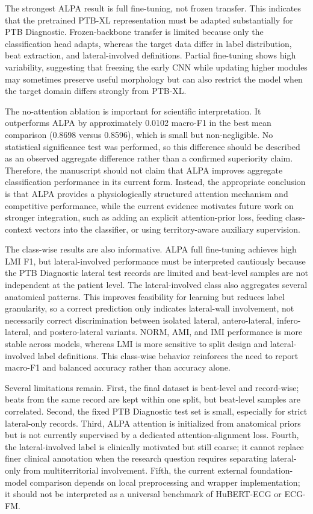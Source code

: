 \documentclass[a4paper,fleqn]{cas-dc}
\begin{document}
The strongest ALPA result is full fine-tuning, not frozen transfer. This indicates that the
pretrained PTB-XL representation must be adapted substantially for PTB Diagnostic. Frozen-backbone
transfer is limited because only the classification head adapts, whereas the target data differ in
label distribution, beat extraction, and lateral-involved definitions. Partial fine-tuning shows
high variability, suggesting that freezing the early CNN while updating higher modules may sometimes
preserve useful morphology but can also restrict the model when the target domain differs strongly
from PTB-XL.

The no-attention ablation is important for scientific interpretation. It outperforms ALPA by
approximately 0.0102 macro-F1 in the best mean comparison (0.8698 versus 0.8596), which is small but
non-negligible. No statistical significance test was performed, so this difference should be
described as an observed aggregate difference rather than a confirmed superiority claim. Therefore,
the manuscript should not claim that ALPA improves aggregate classification performance in its
current form. Instead, the appropriate conclusion is that ALPA provides a physiologically structured
attention mechanism and competitive performance, while the current evidence motivates future work on
stronger integration, such as adding an explicit attention-prior loss, feeding class-context vectors
into the classifier, or using territory-aware auxiliary supervision.

The class-wise results are also informative. ALPA full fine-tuning achieves high LMI F1, but
lateral-involved performance must be interpreted cautiously because the PTB Diagnostic lateral test
records are limited and beat-level samples are not independent at the patient level. The
lateral-involved class also aggregates several anatomical patterns. This improves feasibility for
learning but reduces label granularity, so a correct prediction only indicates lateral-wall
involvement, not necessarily correct discrimination between isolated lateral, antero-lateral,
infero-lateral, and postero-lateral variants. NORM, AMI, and IMI performance is more stable across
models, whereas LMI is more sensitive to split design and lateral-involved label definitions. This
class-wise behavior reinforces the need to report macro-F1 and balanced accuracy rather than
accuracy alone.

Several limitations remain. First, the final dataset is beat-level and record-wise; beats from the
same record are kept within one split, but beat-level samples are correlated. Second, the fixed PTB
Diagnostic test set is small, especially for strict lateral-only records. Third, ALPA attention is
initialized from anatomical priors but is not currently supervised by a dedicated
attention-alignment loss. Fourth, the lateral-involved label is clinically motivated but still
coarse; it cannot replace finer clinical annotation when the research question requires separating
lateral-only from multiterritorial involvement. Fifth, the current external foundation-model
comparison depends on local preprocessing and wrapper implementation; it should not be interpreted
as a universal benchmark of HuBERT-ECG or ECG-FM.
\end{document}
